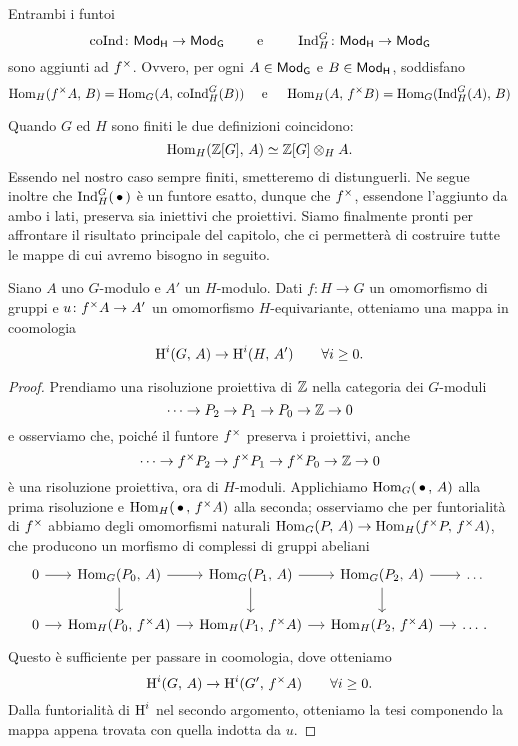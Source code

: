 \begin{proposition}\label{aggiunzione}
	Entrambi i funtoi
	\[ \operatorname{coInd} \colon \mathsf{Mod}_\mathsf{H} \to \mathsf{Mod}_\mathsf{G} \qquad\text{ e }\qquad  \operatorname{Ind}_H^G \colon \mathsf{Mod}_\mathsf{H} \to \mathsf{Mod}_\mathsf{G} \]
	sono aggiunti ad $ f^\times $. Ovvero, per ogni $ A \in \mathsf{Mod}_\mathsf{G} $ e $ B \in \mathsf{Mod}_\mathsf{H} $, soddisfano
	\[ \operatorname{Hom}_H(f^\times A, \, B) = \operatorname{Hom}_G(A,\, \operatorname{coInd}_H^G(B)) \quad\text{ e }\quad  \operatorname{Hom}_H(A, \, f^\times B) = \operatorname{Hom}_G(\operatorname{Ind}_{H}^G(A),\, B) \]
\end{proposition}

Quando $ G $ ed $ H $ sono finiti le due definizioni coincidono:
\[ \operatorname{Hom}_H(\mathbb{Z}[G], \, A)  \simeq \mathbb{Z}[G] \otimes_H A. \]
Essendo nel nostro caso sempre finiti, smetteremo di distunguerli. Ne segue inoltre che $ \operatorname{Ind}_{H}^G(\, \bullet \, ) $ è un funtore esatto, dunque che $ f^\times $, essendone l'aggiunto da ambo i lati, preserva sia iniettivi che proiettivi. Siamo finalmente pronti per affrontare il risultato principale del capitolo, che ci permetterà di costruire tutte le mappe di cui avremo bisogno in seguito.
\begin{proposition}\label{funct}
	Siano  $ A $ uno $ G $-modulo e $ A' $ un $ H $-modulo. Dati $ f \colon H \to G $ un omomorfismo di gruppi e $ u \colon f^\times A \to A' $ un omomorfismo $ H $-equivariante, otteniamo una mappa in coomologia
	\[ \operatorname{H}^i(G, \, A) \to \operatorname{H}^i(H, \, A') \qquad\forall i \geq 0. \]
\end{proposition}

\begin{proof}
	Prendiamo una risoluzione proiettiva di $ \mathbb{Z} $ nella categoria dei $ G $-moduli
	\[ \dots \to P_2 \to P_1 \to P_0 \to \mathbb{Z} \to 0 \]
	e osserviamo che, poiché il funtore $ f^\times $ preserva i proiettivi, anche
	\[ \dots \to f^\times P_2 \to  f^\times P_1 \to f^\times P_0 \to \mathbb{Z} \to 0 \]
	è una risoluzione proiettiva, ora di $ H $-moduli.
	Applichiamo $ \operatorname{Hom}_G(\,\bullet\, ,\, A) $ alla prima risoluzione e $ \operatorname{Hom}_H(\,\bullet\, ,\, f^\times A) $ alla seconda; osserviamo che per funtorialità di $ f^\times $ abbiamo degli omomorfismi naturali $ \operatorname{Hom}_{G}(P, \, A) \to \operatorname{Hom}_{H}(f^\times P, \,f^\times A) $, che producono un morfismo di complessi di gruppi abeliani
	\[\begin{tikzcd}[column sep = small]
	0 \rar
	& \Hom_{G}(P_0, \, A) \rar \dar
	& \Hom_{G}(P_1, \, A) \rar \dar
	& \Hom_{G}(P_2, \, A) \rar \dar
	& \dots \\
	0 \rar
	& \Hom_{H}(P_0, \,\f A) \rar
	& \Hom_{H}(P_1, \,\f A) \rar
	& \Hom_{H}(P_2, \,\f A) \rar
	& \dots	\, .
	\end{tikzcd} \]
	Questo è sufficiente per passare in coomologia, dove otteniamo
	\[ \operatorname{H}^i(G, \, A) \to \operatorname{H}^i(G', \, f^\times A) \qquad \forall i \geq 0. \]
	Dalla funtorialità di $ \operatorname{H}^i $ nel secondo argomento, otteniamo la tesi componendo la mappa appena trovata con quella indotta da $ u $.
\end{proof}

